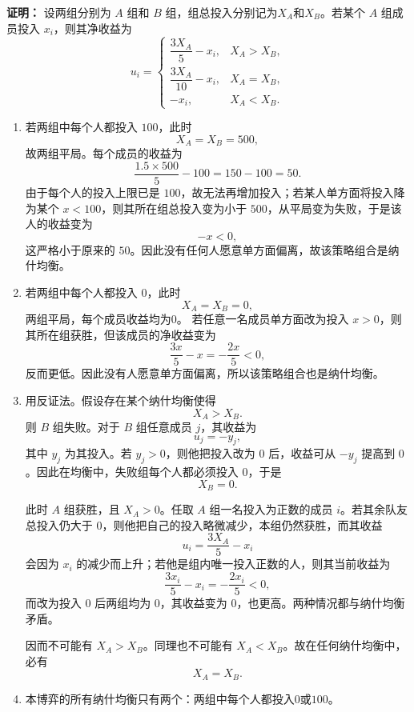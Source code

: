 \documentclass[12pt,a4paper]{article}
\begin{document}
\noindent\textbf{证明：}
设两组分别为 \(A\) 组和 \(B\) 组，组总投入分别记为\(X_A\)和\(X_B\)。若某个 \(A\) 组成员投入 \(x_i\)，则其净收益为
\[
  u_i=
  \begin{cases}
    \dfrac{3X_A}{5}-x_i, & X_A>X_B,\\[6pt]
    \dfrac{3X_A}{10}-x_i, & X_A=X_B,\\[6pt]
    -x_i, & X_A<X_B.
  \end{cases}
\]

\begin{enumerate}[label=\alph*.]

  \item 若两组中每个人都投入 \(100\)，此时
  \[
    X_A=X_B=500,
  \]
  故两组平局。每个成员的收益为
  \[
    \frac{1.5\times 500}{5}-100=150-100=50.
  \]
  由于每个人的投入上限已是 \(100\)，故无法再增加投入；若某人单方面将投入降为某个 \(x<100\)，则其所在组总投入变为小于 \(500\)，从平局变为失败，于是该人的收益变为
  \[
    -x<0,
  \]
  这严格小于原来的 \(50\)。因此没有任何人愿意单方面偏离，故该策略组合是纳什均衡。

  \item 若两组中每个人都投入 \(0\)，此时
  \[
    X_A=X_B=0,
  \]
  两组平局，每个成员收益均为\(0\)。
  若任意一名成员单方面改为投入 \(x>0\)，则其所在组获胜，但该成员的净收益变为
  \[
    \frac{3x}{5}-x=-\frac{2x}{5}<0,
  \]
  反而更低。因此没有人愿意单方面偏离，所以该策略组合也是纳什均衡。

  \item 用反证法。假设存在某个纳什均衡使得
  \[
    X_A>X_B.
  \]
  则 \(B\) 组失败。对于 \(B\) 组任意成员 \(j\)，其收益为
  \[
    u_j=-y_j,
  \]
  其中 \(y_j\) 为其投入。若 \(y_j>0\)，则他把投入改为 \(0\) 后，收益可从 \(-y_j\) 提高到 \(0\)。因此在均衡中，失败组每个人都必须投入 \(0\)，于是
  \[
    X_B=0.
  \]

  此时 \(A\) 组获胜，且 \(X_A>0\)。任取 \(A\) 组一名投入为正数的成员 \(i\)。若其余队友总投入仍大于 \(0\)，则他把自己的投入略微减少，本组仍然获胜，而其收益
  \[
    u_i=\frac{3X_A}{5}-x_i
  \]
  会因为 \(x_i\) 的减少而上升；若他是组内唯一投入正数的人，则其当前收益为
  \[
    \frac{3x_i}{5}-x_i=-\frac{2x_i}{5}<0,
  \]
  而改为投入 \(0\) 后两组均为 \(0\)，其收益变为 \(0\)，也更高。两种情况都与纳什均衡矛盾。

  因而不可能有 \(X_A>X_B\)。同理也不可能有 \(X_A<X_B\)。故在任何纳什均衡中，必有
  \[
    X_A=X_B.
  \]

  \item 本博弈的所有纳什均衡只有两个：两组中每个人都投入\(0\)或\(100\)。
  

\end{enumerate}
\end{document}
